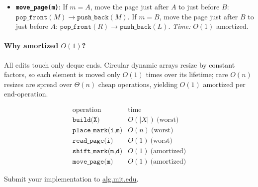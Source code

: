 \documentclass[12pt,twoside]{article}
\begin{document}
\begin{problems}
\begin{itemize}
  \item \textbf{\texttt{move\_page(m)}}:
        If \(m=A\), move the page just after \(A\) to just before \(B\):
        \(\texttt{pop\_front}(M)\to\texttt{push\_back}(M)\).
        If \(m=B\), move the page just after \(B\) to just before \(A\):
        \(\texttt{pop\_front}(R)\to\texttt{push\_back}(L)\).
        \emph{Time:} \(O(1)\) amortized.
\end{itemize}

\paragraph{Why amortized \(O(1)\)?}
All edits touch only deque ends. Circular dynamic arrays resize by constant factors, so each element
is moved only \(O(1)\) times over its lifetime; rare \(O(n)\) resizes are spread over \(\Theta(n)\) cheap operations,
yielding \(O(1)\) amortized per end-operation.

\[
\begin{array}{l|c}
\text{operation} & \text{time} \\\hline
\texttt{build(X)} & O(|X|)\ \text{(worst)}\\
\texttt{place\_mark(i,m)} & O(n)\ \text{(worst)}\\
\texttt{read\_page(i)} & O(1)\ \text{(worst)}\\
\texttt{shift\_mark(m,d)} & O(1)\ \text{(amortized)}\\
\texttt{move\_page(m)} & O(1)\ \text{(amortized)}
\end{array}
\]
\newpage
\problem  %

\begin{problemparts}
\problempart %
\problempart %
\problempart %
\problempart Submit your implementation to {\small\url{alg.mit.edu}}.
\end{problemparts}

\end{problems}
\end{document}

